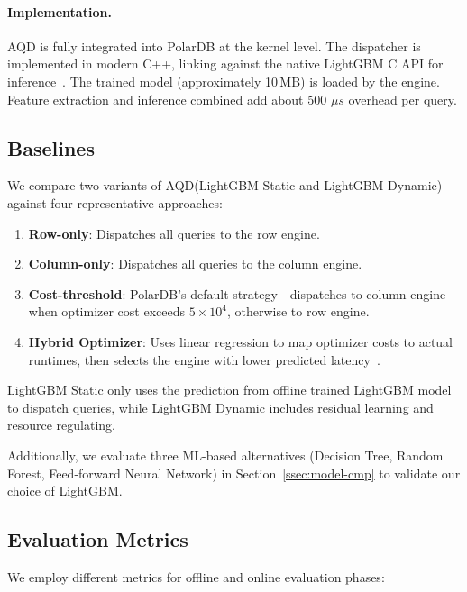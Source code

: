 \documentclass[sigconf, nonacm]{acmart}
\newcommand{\dispatcher}{AQD\xspace}
\begin{document}
\vspace{-0.8em}

\paragraph{Implementation.}
\dispatcher is fully integrated into PolarDB at the kernel level. The dispatcher is implemented in modern C++, linking against the native LightGBM C API for inference~\cite{ke2017lightgbm}. The trained model (approximately 10\,MB) is loaded by the engine. Feature extraction and inference combined add about 500 $\mu s$ overhead per query.

\subsection{Baselines}

We compare two variants of \dispatcher (LightGBM Static and LightGBM Dynamic) against four representative approaches:

\begin{enumerate}[leftmargin=*,itemsep=2pt]
  \item \textbf{Row-only}: Dispatches all queries to the row engine.
  \item \textbf{Column-only}: Dispatches all queries to the column engine.
  \item \textbf{Cost-threshold}: PolarDB's default strategy—dispatches to column engine when optimizer cost exceeds $5\times10^{4}$, otherwise to row engine.
  \item \textbf{Hybrid Optimizer}: Uses linear regression to map optimizer costs to actual runtimes, then selects the engine with lower predicted latency~\cite{PolarDBHybridOptimizerBlog}.
\end{enumerate}

LightGBM Static only uses the prediction from offline trained LightGBM model to dispatch queries, while LightGBM Dynamic includes residual learning and resource regulating.

Additionally, we evaluate three ML-based alternatives (Decision Tree, Random Forest, Feed-forward Neural Network) in Section~\ref{ssec:model-cmp} to validate our choice of LightGBM.


\subsection{Evaluation Metrics}
We employ different metrics for offline and online evaluation phases:
\end{document}
